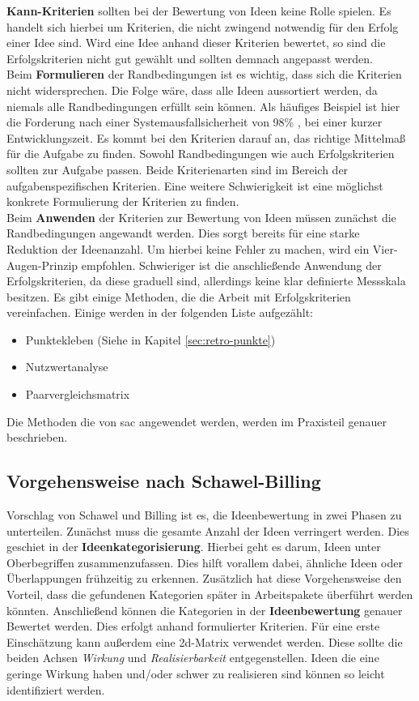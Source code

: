 \textbf{Kann-Kriterien} sollten bei der Bewertung von Ideen keine Rolle spielen. Es handelt sich hierbei 
um Kriterien, die nicht zwingend notwendig für den Erfolg einer Idee sind. Wird eine Idee anhand dieser Kriterien 
bewertet, so sind die Erfolgskriterien nicht gut gewählt und sollten demnach angepasst werden.\\

Beim \textbf{Formulieren} der Randbedingungen ist es wichtig, dass sich die Kriterien nicht
widersprechen. Die Folge wäre, dass alle Ideen aussortiert werden, da niemals alle Randbedingungen erfüllt sein können.
Als häufiges Beispiel ist hier die Forderung nach einer Systemausfallsicherheit von 98\% , bei einer
kurzer Entwicklungszeit. 
Es kommt bei den Kriterien darauf an, das richtige Mittelmaß für die Aufgabe zu finden. 
Sowohl Randbedingungen wie auch Erfolgskriterien sollten zur Aufgabe passen. Beide Kriterienarten sind im 
Bereich der aufgabenspezifischen Kriterien. Eine weitere Schwierigkeit ist eine möglichst konkrete
Formulierung der Kriterien zu finden. \\

Beim \textbf{Anwenden} der Kriterien zur Bewertung von Ideen müssen zunächst die Randbedingungen angewandt werden. 
Dies sorgt bereits für eine starke Reduktion der Ideenanzahl. Um hierbei keine Fehler zu machen, wird 
ein Vier-Augen-Prinzip empfohlen. 
Schwieriger ist die anschließende Anwendung der Erfolgskriterien, da diese graduell sind, allerdings keine klar 
definierte Messskala besitzen. 
Es gibt einige Methoden, die die Arbeit mit Erfolgskriterien vereinfachen. Einige werden 
in der folgenden Liste aufgezählt: 
\begin{itemize}
    \item Punktekleben (Siehe in Kapitel \ref{sec:retro-punkte})
    \item Nutzwertanalyse
    \item Paarvergleichsmatrix
\end{itemize}
Die Methoden die von \ac{sac} angewendet werden, werden im Praxisteil genauer beschrieben. \cite{zephram:2018}

\subsection{Vorgehensweise nach Schawel-Billing}
Vorschlag von Schawel und Billing ist es, die Ideenbewertung in zwei Phasen zu unterteilen. Zunächst muss die gesamte Anzahl 
der Ideen verringert werden. Dies geschiet in der \textbf{Ideenkategorisierung}. Hierbei geht es darum, Ideen unter 
Oberbegriffen zusammenzufassen. Dies hilft vorallem dabei, ähnliche Ideen oder Überlappungen frühzeitig zu erkennen.
Zusätzlich hat diese Vorgehensweise den Vorteil, dass die gefundenen Kategorien später in Arbeitspakete überführt werden 
könnten. Anschließend können die Kategorien in der \textbf{Ideenbewertung} genauer Bewertet werden. 
Dies erfolgt anhand formulierter Kriterien. Für eine erste Einschätzung kann außerdem eine \ac{2d}-Matrix verwendet werden. 
Diese sollte die beiden Achsen \textit{Wirkung} und \textit{Realisierbarkeit} entgegenstellen. Ideen die eine geringe Wirkung haben und/oder 
schwer zu realisieren sind können so leicht identifiziert werden. \cite{schawel:2009}